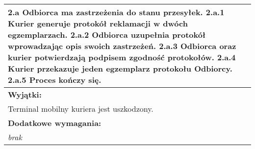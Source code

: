 \begin{center}
\begin{longtable}[h]{|p{1.6cm}|p{13.5cm}|}
\multicolumn{2}{|p{15.1cm}|}{
2.a Odbiorca ma zastrzeżenia do stanu przesyłek. \newline
2.a.1 Kurier generuje protokół reklamacji w dwóch egzemplarzach. \newline
2.a.2 Odbiorca uzupełnia protokół wprowadzając opis swoich zastrzeżeń. \newline
2.a.3 Odbiorca oraz kurier potwierdzają podpisem zgodność protokołów. \newline
2.a.4 Kurier przekazuje jeden egzemplarz protokołu Odbiorcy. \newline
2.a.5 Proces kończy się.
} \\ \hline
\multicolumn{2}{|p{15.1cm}|}{\textbf{Wyjątki:}} \\
\multicolumn{2}{|p{15.1cm}|}{
Terminal mobilny kuriera jest uszkodzony.
} \\ \hline
\multicolumn{2}{|p{15.1cm}|}{\textbf{Dodatkowe wymagania:}} \\
\multicolumn{2}{|p{15.1cm}|}{
\textit{brak}
} \\
\hline
\end{longtable}
\end{center}

